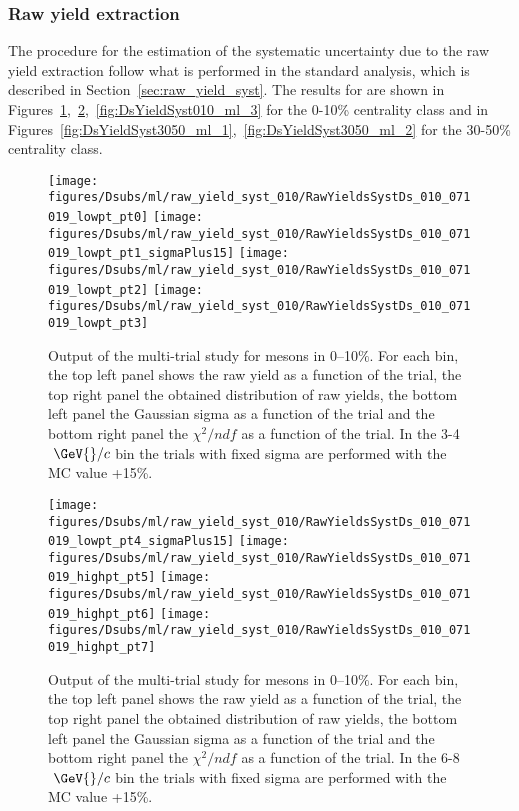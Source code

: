 \subsubsection{Raw yield extraction}
The procedure for the estimation of the systematic uncertainty due to the raw yield extraction follow what is performed 
in the standard analysis, which is described in Section~\ref{sec:raw_yield_syst}.  The results for \Dsubs{} are shown in 
Figures~\ref{fig:DsYieldSyst010_ml_1},~\ref{fig:DsYieldSyst010_ml_2},~\ref{fig:DsYieldSyst010_ml_3} for the 0-10\% centrality 
class and in Figures~\ref{fig:DsYieldSyst3050_ml_1},~\ref{fig:DsYieldSyst3050_ml_2} for the 30-50\% centrality class.
\begin{figure}[htbp]
  \begin{center}
  \texttt{[image: figures/Dsubs/ml/raw\_yield\_syst\_010/RawYieldsSystDs\_010\_071019\_lowpt\_pt0]}
  \texttt{[image: figures/Dsubs/ml/raw\_yield\_syst\_010/RawYieldsSystDs\_010\_071019\_lowpt\_pt1\_sigmaPlus15]}
  \texttt{[image: figures/Dsubs/ml/raw\_yield\_syst\_010/RawYieldsSystDs\_010\_071019\_lowpt\_pt2]}
  \texttt{[image: figures/Dsubs/ml/raw\_yield\_syst\_010/RawYieldsSystDs\_010\_071019\_lowpt\_pt3]}
  \caption{Output of the multi-trial study for \Dsubs mesons in 0--10$\%$. For each \pt bin, the top left panel shows the raw yield 
           as a function of the trial, the top right panel the obtained distribution of raw yields, the bottom left panel the Gaussian 
           sigma as a function of the trial and the bottom right panel the $\chi^2/ndf$ as a function of the trial. In the 3-4 
           \(~\GeV{}/c\) \pt{} bin the trials with fixed sigma are performed with the MC value +15\%.}
  \label{fig:DsYieldSyst010_ml_1}
  \end{center}
\end{figure}
\begin{figure}[htbp]
  \begin{center}
  \texttt{[image: figures/Dsubs/ml/raw\_yield\_syst\_010/RawYieldsSystDs\_010\_071019\_lowpt\_pt4\_sigmaPlus15]}
  \texttt{[image: figures/Dsubs/ml/raw\_yield\_syst\_010/RawYieldsSystDs\_010\_071019\_highpt\_pt5]}
  \texttt{[image: figures/Dsubs/ml/raw\_yield\_syst\_010/RawYieldsSystDs\_010\_071019\_highpt\_pt6]}
  \texttt{[image: figures/Dsubs/ml/raw\_yield\_syst\_010/RawYieldsSystDs\_010\_071019\_highpt\_pt7]}
  \caption{Output of the multi-trial study for \Dsubs mesons in 0--10$\%$. For each \pt bin, the top left panel shows the raw yield 
           as a function of the trial, the top right panel the obtained distribution of raw yields, the bottom left panel the Gaussian 
           sigma as a function of the trial and the bottom right panel the $\chi^2/ndf$ as a function of the trial. In the 6-8 
           \(~\GeV{}/c\) \pt{} bin the trials with fixed sigma are performed with the MC value +15\%.}
  \label{fig:DsYieldSyst010_ml_2}
  \end{center}
\end{figure}
